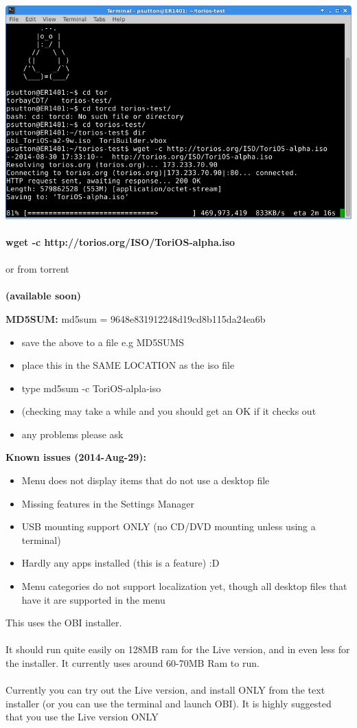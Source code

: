 \documentclass[12pt,a4paper]{book}
\begin{document}
\includegraphics[width=0.7\linewidth]{torios-wget-download} \\ \\
\textbf{wget -c http://torios.org/ISO/ToriOS-alpha.iso} \\ \\
or from torrent \\ \\
\textbf{(available soon)}

\textbf{MD5SUM: } md5sum = 9648e831912248d19cd8b115da24ea6b \\ 
\begin{itemize}
\item{save the above to a file e.g MD5SUMS}
\item{place this in the SAME LOCATION as the iso file}
\item{type md5sum -c ToriOS-alpla-iso} 
\item({checking may take a while and you should get an OK if it checks out}
\item{any problems please ask}
\end{itemize}

\textbf{Known issues (2014-Aug-29):}
\begin{itemize}
\item{Menu does not display items that do not use a desktop file}  
\item{Missing features in the Settings Manager}
\item{USB mounting support ONLY (no CD/DVD mounting unless using a terminal)}
\item{Hardly any apps installed (this is a feature) :D}
\item{Menu categories do not support localization yet, though all desktop files that have it are supported in the menu}
\end{itemize}

This uses the OBI installer. \\ \\
It should run quite easily on 128MB ram for the Live version, and in even less for the installer.  It currently uses around 60-70MB Ram to run. \\ \\
Currently you can try out the Live version, and install ONLY from the text installer (or you can use the terminal and launch OBI).
It is highly suggested that you use the Live version ONLY \\ \\
\end{document}
